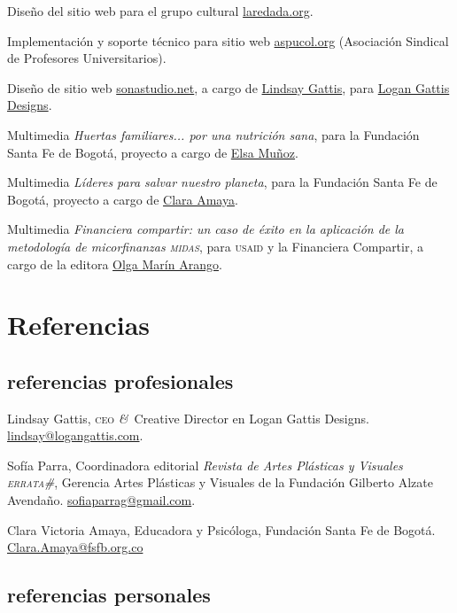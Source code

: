 \documentclass[12pt,letterpaper,final,usenames,dvipsnames]{article}
\newcommand{\amper}{\textit{\&}}
\newcommand{\years}[1]{\marginnote{\scriptsize #1}}
\begin{document}
\years{2012}Diseño del sitio web para el grupo cultural \href{http:\\laredada.org}{laredada.org}.

\years{2012}Implementación y soporte técnico para sitio web \href{http://www.aspucol.org}{aspucol.org} (Asociación Sindical de Profesores Universitarios).

\years{2011}Diseño de sitio web \href{http://www.sonastudio.net}{sonastudio.net}, a cargo de \href{mailto:lindsay@logangattis.com}{Lindsay Gattis}, para \href{http://logangattis.com}{Logan Gattis Designs}.

\years{2011}Multimedia \emph{Huertas familiares... por una nutrición sana}, para la Fundación Santa Fe de Bogotá, proyecto a cargo de \href{mailto:Elsa.Munoz@fsfb.org.co}{Elsa Muñoz}.

\years{2010}Multimedia \emph{Líderes para salvar nuestro planeta}, para la Fundación Santa Fe de Bogotá, proyecto a cargo de \href{mailto:Clara.Amaya@fsfb.org.co}{Clara Amaya}.

\years{2009}Multimedia \emph{Financiera compartir: un caso de éxito en la aplicación de la metodología de micorfinanzas \textsc{midas}}, para \textsc{usaid} y la Financiera Compartir, a cargo de la editora \href{mailto:olgamarinarango@gmail.com}{Olga Marín Arango}.


\section*{Referencias}

\subsection*{referencias profesionales}

Lindsay Gattis, \textsc{ceo} \amper\ Creative Director en Logan Gattis Designs.  \href{mailto:lindsay@logangattis.com}{lindsay@logangattis.com}.
\vspace{6pt}

Sofía Parra, Coordinadora editorial \emph{Revista de Artes Plásticas y Visuales \textsc{errata\#}}, Gerencia Artes Plásticas y Visuales de la Fundación Gilberto Alzate Avendaño. \href{mailto:sofiaparrag@gmail.com}{sofiaparrag@gmail.com}.
\vspace{6pt}

Clara Victoria Amaya, Educadora y Psicóloga, Fundación Santa Fe de Bogotá.  \href{mailto:Clara.Amaya@fsfb.org.co}{Clara.Amaya@fsfb.org.co}

\subsection*{referencias personales}
\end{document}
